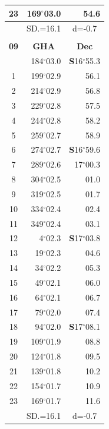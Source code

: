 \documentclass[10pt, a4paper]{report}
\begin{document}
\begin{scriptsize}
\begin{tabular*}{0.2\textwidth}[t]{@{\extracolsep{\fill}}|c|rr|}
23 & 169$^\circ$03.0 & 54.6\\
\hline
\rule{0pt}{2.4ex} & \multicolumn{1}{c}{SD.=16.1} & \multicolumn{1}{c|}{d=-0.7}\\
\hline
\multicolumn{1}{c}{}\\[-0.5ex]\hline
\multicolumn{1}{|c|}{\rule{0pt}{2.6ex}\textbf{09}} & \multicolumn{1}{c}{\textbf{GHA}} & \multicolumn{1}{c|}{\textbf{Dec}}\\
\hline\rule{0pt}{2.6ex}\noindent
0 & 184$^\circ$03.0 & \textbf{S}16$^\circ$55.3\\
1 & 199$^\circ$02.9 & 56.1\\
2 & 214$^\circ$02.9 & 56.8\\
3 & 229$^\circ$02.8 & \raisebox{0.24ex}{\boldmath$\cdot$~\boldmath$\cdot$~~}57.5\\
4 & 244$^\circ$02.8 & 58.2\\
5 & 259$^\circ$02.7 & 58.9\\[2Pt]
6 & 274$^\circ$02.7 & \textbf{S}16$^\circ$59.6\\
7 & 289$^\circ$02.6 & 17$^\circ$00.3\\
8 & 304$^\circ$02.5 & 01.0\\
9 & 319$^\circ$02.5 & \raisebox{0.24ex}{\boldmath$\cdot$~\boldmath$\cdot$~~}01.7\\
10 & 334$^\circ$02.4 & 02.4\\
11 & 349$^\circ$02.4 & 03.1\\[2Pt]
12 & 4$^\circ$02.3 & \textbf{S}17$^\circ$03.8\\
13 & 19$^\circ$02.3 & 04.6\\
14 & 34$^\circ$02.2 & 05.3\\
15 & 49$^\circ$02.1 & \raisebox{0.24ex}{\boldmath$\cdot$~\boldmath$\cdot$~~}06.0\\
16 & 64$^\circ$02.1 & 06.7\\
17 & 79$^\circ$02.0 & 07.4\\[2Pt]
18 & 94$^\circ$02.0 & \textbf{S}17$^\circ$08.1\\
19 & 109$^\circ$01.9 & 08.8\\
20 & 124$^\circ$01.8 & 09.5\\
21 & 139$^\circ$01.8 & \raisebox{0.24ex}{\boldmath$\cdot$~\boldmath$\cdot$~~}10.2\\
22 & 154$^\circ$01.7 & 10.9\\
23 & 169$^\circ$01.7 & 11.6\\
\hline
\rule{0pt}{2.4ex} & \multicolumn{1}{c}{SD.=16.1} & \multicolumn{1}{c|}{d=-0.7}\\
\hline
\end{tabular*}\noindent

\end{scriptsize}
\end{document}
